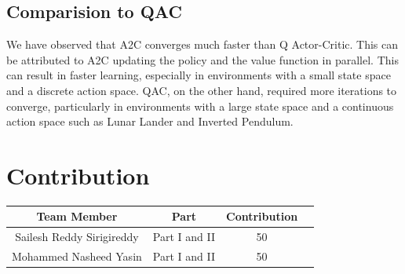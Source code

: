 \documentclass{article} %
\begin{document}
\subsection{Comparision to QAC}
We have observed that A2C converges much faster than Q Actor-Critic. This can be attributed to A2C updating the policy and the value function in parallel. This can result in faster learning, especially in environments with a small state space and a discrete action space. QAC, on the other hand, required more iterations to converge, particularly in environments with a large state space and a continuous action space such as Lunar Lander and Inverted Pendulum.

\section{Contribution}

\begin{center}
    \begin{tabular}{cccc}
        \toprule
        Team Member & Part & Contribution \\
        \midrule
        Sailesh Reddy Sirigireddy & Part I and II & 50 \\
        Mohammed Nasheed Yasin & Part I and II & 50 \\
        \bottomrule
    \end{tabular}
\end{center}

\printbibliography
\end{document}

